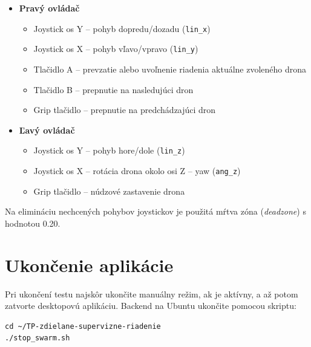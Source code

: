 \documentclass[a4paper,12pt]{article}
\begin{document}
\begin{itemize}
    \item \textbf{Pravý ovládač}
    \begin{itemize}
        \item Joystick os Y -- pohyb dopredu/dozadu (\texttt{lin\_x})
        \item Joystick os X -- pohyb vľavo/vpravo (\texttt{lin\_y})
        \item Tlačidlo A -- prevzatie alebo uvoľnenie riadenia aktuálne zvoleného drona
        \item Tlačidlo B -- prepnutie na nasledujúci dron
        \item Grip tlačidlo -- prepnutie na predchádzajúci dron
    \end{itemize}

    \item \textbf{Ľavý ovládač}
    \begin{itemize}
        \item Joystick os Y -- pohyb hore/dole (\texttt{lin\_z})
        \item Joystick os X -- rotácia drona okolo osi Z -- yaw (\texttt{ang\_z})
        \item Grip tlačidlo -- núdzové zastavenie drona
    \end{itemize}
\end{itemize}

Na elimináciu nechcených pohybov joystickov je použitá mŕtva zóna (\textit{deadzone}) s hodnotou 0.20.

\section{Ukončenie aplikácie}
Pri ukončení testu najskôr ukončite manuálny režim, ak je aktívny, a až potom zatvorte desktopovú aplikáciu. Backend na Ubuntu ukončite pomocou skriptu: 

\begin{lstlisting}[style=terminal]
cd ~/TP-zdielane-supervizne-riadenie
./stop_swarm.sh
\end{lstlisting}
\end{document}
